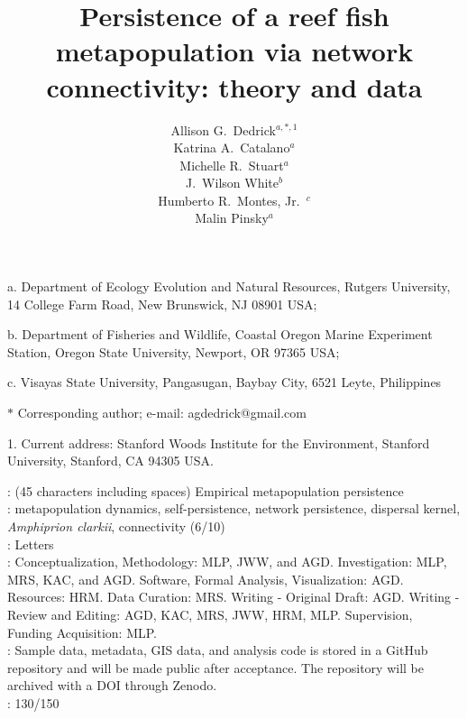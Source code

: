 \documentclass[12pt, oneside]{article}   	%
\author{}
\author{Allison G.\ Dedrick$^{a, \ast, 1}$ \\
Katrina A.\ Catalano$^a$ \\
Michelle R.\ Stuart$^a$ \\
J.\ Wilson White$^b$ \\
Humberto R.\ Montes, Jr.\ $^c$ \\
Malin Pinsky$^a$}
\title{Persistence of a reef fish metapopulation via network connectivity: theory and data}
\date{}
\begin{document}
\renewcommand{\topfraction}{0.95}
\maketitle{}

\noindent{} a. Department of Ecology Evolution and Natural Resources, Rutgers University, 14 College Farm Road, New Brunswick, NJ 08901 USA;

\noindent{} b. Department of Fisheries and Wildlife, Coastal Oregon Marine Experiment Station, Oregon State University, Newport, OR 97365 USA;

\noindent{} c. Visayas State University, Pangasugan, Baybay City, 6521 Leyte, Philippines

\noindent{} $\ast$ Corresponding author; e-mail: agdedrick@gmail.com

\noindent{} 1. Current address: Stanford Woods Institute for the Environment, Stanford University, Stanford, CA 94305 USA.


: (45 characters including spaces) Empirical metapopulation persistence \\

: metapopulation dynamics, self-persistence, network persistence, dispersal kernel, \textit{Amphiprion clarkii}, connectivity (6/10) \\ 

: Letters \\ 

: Conceptualization, Methodology: MLP, JWW, and AGD. Investigation: MLP, MRS, KAC, and AGD. Software, Formal Analysis, Visualization: AGD. Resources: HRM. Data Curation: MRS. Writing - Original Draft: AGD. Writing - Review and Editing: AGD, KAC, MRS, JWW, HRM, MLP. Supervision, Funding Acquisition: MLP.  \\

: Sample data, metadata, GIS data, and analysis code is stored in a GitHub repository and will be made public after acceptance. The repository will be archived with a DOI through Zenodo. \\

: 130/150\\ 
\end{document}
